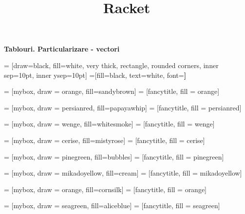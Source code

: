 \documentclass[a4paper]{article}
\title{Racket}
\begin{document}
\begin{center}{\huge{\textbf{Tablouri. Particularizare - vectori}}}
\end{center}
\begin{multicols*}{3}

 = [draw=black, fill=white, very thick,
    rectangle, rounded corners, inner sep=10pt, inner ysep=10pt]
 =[fill=black, text=white, font=\bfseries]

 = [mybox, draw = orange, fill=sandybrown]
 = [fancytitle, fill = orange]


 = [mybox, draw = persianred, fill=papayawhip]
 = [fancytitle, fill = persianred]

 = [mybox, draw = wenge, fill=whitesmoke]
 = [fancytitle, fill = wenge]

 = [mybox, draw = cerise, fill=mistyrose]
 = [fancytitle, fill = cerise]

 = [mybox, draw = pinegreen, fill=bubbles]
 = [fancytitle, fill = pinegreen]

 = [mybox, draw = mikadoyellow, fill=cream]
 = [fancytitle, fill = mikadoyellow]

 = [mybox, draw = orange, fill=cornsilk]
 = [fancytitle, fill = orange]

 = [mybox, draw = seagreen, fill=aliceblue]
 = [fancytitle, fill = seagreen]


\end{multicols*}
\end{document}
